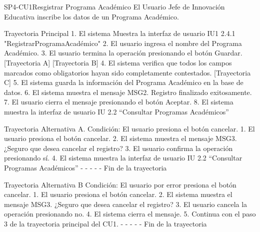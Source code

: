  \begin{UseCase}[marker]{SP4-CU1}{Resgistrar Programa Académico}
	{
		El Usuario Jefe de Innovación Educativa inscribe los datos de un Programa Académico.
	}
 \end{UseCase}

Trayectoria Principal
1.	El sistema Muestra la interfaz de usuario IU1 2.4.1 "RegistrarProgramaAcadémico"
2.	El usuario ingresa el nombre del Programa Académico.
3.	El usuario termina la operación presionando el botón Guardar. [Trayectoria A] [Trayectoria B]
4.	El sistema verifica que todos los campos marcados como obligatorios hayan sido completamente contestados. [Trayectoria C]
5.	El sistema guarda la información del Programa Académico en la base de datos.
6.	El sistema muestra el mensaje MSG2. Registro finalizado exitosamente.
7.	El usuario cierra el mensaje presionando el botón Aceptar.
8.	El sistema muestra la interfaz de usuario IU 2.2 “Consultar Programas Académicos”

Trayectoria Alternativa A.
Condición: El usuario presiona el botón cancelar.
1.	El usuario presiona el botón cancelar.
2.	El sistema muestra el mensaje MSG3. ¿Seguro que desea cancelar el registro? 
3.	El usuario confirma la operación presionando sí.
4.	El sistema muestra la interfaz de usuario IU 2.2 “Consultar Programas Académicos”
-	- - - - Fin de la trayectoria

Trayectoria Alternativa B
Condición: El usuario por error presiona el botón cancelar.
1.	El usuario presiona el botón cancelar.
2.	El sistema muestra el mensaje MSG3. ¿Seguro que desea cancelar el registro? 
3.	El usuario cancela la operación presionando no.
4.	El sistema cierra el mensaje.
5.	Continua con el paso 3 de la trayectoria principal del CU1.
-	- - - - Fin de la trayectoria

